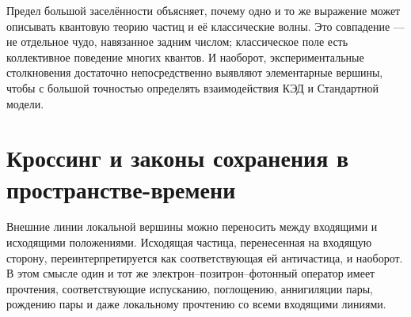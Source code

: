 \begin{classroomqa}
\end{classroomqa}

Предел большой заселённости объясняет, почему одно и то же выражение может описывать квантовую теорию частиц и её классические волны. Это совпадение — не отдельное чудо, навязанное задним числом; классическое поле есть коллективное поведение многих квантов. И наоборот, экспериментальные столкновения достаточно непосредственно выявляют элементарные вершины, чтобы с большой точностью определять взаимодействия КЭД и Стандартной модели.

\section{Кроссинг и законы сохранения в пространстве-времени}

Внешние линии локальной вершины можно переносить между входящими и исходящими положениями. Исходящая частица, перенесенная на входящую сторону, переинтерпретируется как соответствующая ей античастица, и наоборот. В этом смысле один и тот же электрон--позитрон--фотонный оператор имеет прочтения, соответствующие испусканию, поглощению, аннигиляции пары, рождению пары и даже локальному прочтению со всеми входящими линиями.

\begin{classroomqa}
\end{classroomqa}

